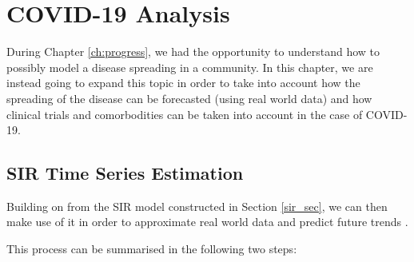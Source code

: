 \chapter{COVID-19 Analysis}
\setcounter{secnumdepth}{5}
\label{ch:AI}
\setlength\lineskip{0pt}
\vspace*{15pt}

 
 
\lstset{style=mystyle}

During Chapter \ref{ch:progress}, we had the opportunity to understand how to possibly model a disease spreading in a community. In this chapter, we are instead going to expand this topic in order to take into account how the spreading of the disease can be forecasted (using real world data) and how clinical trials and comorbodities can be taken into account in the case of COVID-19.

\section{SIR Time Series Estimation}
\label{tool_ref_app}
Building on from the SIR model constructed in Section \ref{sir_sec}, we can then make use of it in order to approximate real world data and predict future trends \cite{atom}.

This process can be summarised in the following two steps:

